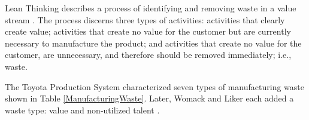 Lean Thinking describes a process of identifying and removing waste in a value stream \cite{WomackLeanThinking}. The process discerns three types of activities: activities that clearly create value; activities that create no value for the customer but are currently necessary to manufacture the product; and activities that create no value for the customer, are unnecessary, and therefore should be removed immediately; i.e., waste. 


The Toyota Production System characterized seven types of manufacturing waste \cite{ShingoToyotaProductionSystem} shown in Table \ref{ManufacturingWaste}. Later, Womack and Liker each added a waste type: value and non-utilized talent \cite{WomackLeanThinking, LikerToyotaWay}.

